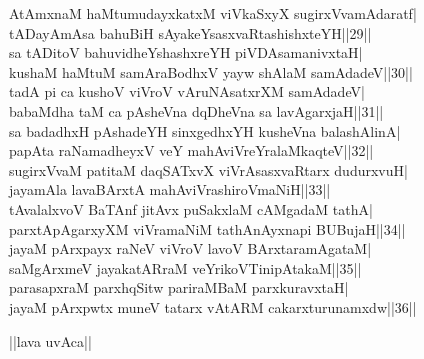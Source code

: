 \documentclass{article}
\begin{document}
AtAmxnaM haMtumudayxkatxM viVkaSxyX sugirxVvamAdaratf|\\
tADayAmAsa bahuBiH sAyakeYsasxvaRtashishxteYH||29||\\
sa tADitoV bahuvidheYshashxreYH piVDAsamanivxtaH|\\
kushaM haMtuM samAraBodhxV yayw shAlaM samAdadeV||30||\\
tadA pi ca kushoV viVroV vAruNAsatxrXM samAdadeV|\\
babaMdha taM ca pAsheVna dqDheVna sa lavAgarxjaH||31||\\
sa badadhxH pAshadeYH sinxgedhxYH kusheVna balashAlinA|\\
papAta raNamadheyxV veY mahAviVreYralaMkaqteV||32||\\
sugirxVvaM patitaM daqSATxvX viVrAsasxvaRtarx dudurxvuH|\\
jayamAla lavaBArxtA mahAviVrashiroVmaNiH||33||\\
tAvalalxvoV BaTAnf jitAvx puSakxlaM cAMgadaM tathA|\\
parxtApAgarxyXM viVramaNiM tathAnAyxnapi BUBujaH||34||\\
jayaM pArxpayx raNeV viVroV lavoV BArxtaramAgataM|\\
saMgArxmeV jayakatARraM veYrikoVTinipAtakaM||35||\\
parasapxraM parxhqSitw pariraMBaM parxkuravxtaH|\\
jayaM pArxpwtx muneV tatarx vAtARM cakarxturunamxdw||36||\\

\begin{center}
||lava uvAca||
\end{center}
\end{document}
